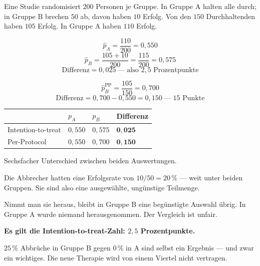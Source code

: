 \begin{aufgabe}
Eine Studie randomisiert $200$ Personen je Gruppe. In Gruppe A halten alle durch; in Gruppe B brechen $50$ ab, davon haben $10$ Erfolg. Von den $150$ Durchhaltenden haben $105$ Erfolg. In Gruppe A haben $110$ Erfolg.

\loesung
{}
\[ \hat p_A = \frac{110}{200} = 0{,}550 \]
\[ \hat p_B = \frac{105 + 10}{200} = \frac{115}{200} = 0{,}575 \]
\[ \text{Differenz} = 0{,}025 \ \text{--- also } 2{,}5 \text{ Prozentpunkte} \]

\[ \hat p_B^{\text{PP}} = \frac{105}{150} = 0{,}700 \]
\[ \text{Differenz} = 0{,}700 - 0{,}550 = 0{,}150 \ \text{--- } 15 \text{ Punkte} \]

\begin{center}
\renewcommand{\arraystretch}{1.48}
\begin{tabular}{@{}P{2.8cm}P{1.8cm}P{1.8cm}P{1.8cm}@{}}
\toprule
& $p_A$ & $p_B$ & \textbf{Differenz}\\
\midrule
Intention-to-treat & $0{,}550$ & $0{,}575$ & $\mathbf{0{,}025}$\\
Per-Protocol & $0{,}550$ & $0{,}700$ & $\mathbf{0{,}150}$\\
\bottomrule
\end{tabular}
\end{center}

Sechsfacher Unterschied zwischen beiden Auswertungen.

Die Abbrecher hatten eine Erfolgsrate von $10/50 = 20\,\%$ --- weit unter beiden Gruppen. Sie sind also eine ausgewählte, ungünstige Teilmenge.

Nimmt man sie heraus, bleibt in Gruppe B eine begünstigte Auswahl übrig. In Gruppe A wurde niemand herausgenommen. Der Vergleich ist unfair.

\textbf{Es gilt die Intention-to-treat-Zahl: $2{,}5$ Prozentpunkte.}

$25\,\%$ Abbrüche in Gruppe B gegen $0\,\%$ in A sind selbst ein Ergebnis --- und zwar ein wichtiges. Die neue Therapie wird von einem Viertel nicht vertragen.

\begin{center}
\begin{minipage}{0.86\textwidth}
\end{minipage}
\end{center}


\end{aufgabe}
